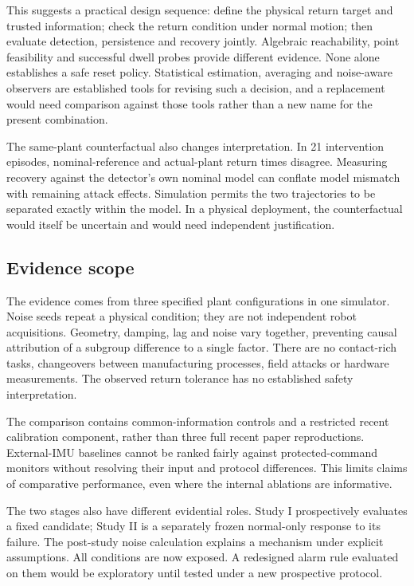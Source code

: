 \documentclass[11pt]{article}
\begin{document}
This suggests a practical design sequence: define the physical return target and trusted information; check the return condition under normal motion; then evaluate detection, persistence and recovery jointly. Algebraic reachability, point feasibility and successful dwell probes provide different evidence. None alone establishes a safe reset policy. Statistical estimation, averaging and noise-aware observers are established tools for revising such a decision, and a replacement would need comparison against those tools rather than a new name for the present combination.

The same-plant counterfactual also changes interpretation. In 21 intervention episodes, nominal-reference and actual-plant return times disagree. Measuring recovery against the detector's own nominal model can conflate model mismatch with remaining attack effects. Simulation permits the two trajectories to be separated exactly within the model. In a physical deployment, the counterfactual would itself be uncertain and would need independent justification.

\subsection{Evidence scope}
The evidence comes from three specified plant configurations in one simulator. Noise seeds repeat a physical condition; they are not independent robot acquisitions. Geometry, damping, lag and noise vary together, preventing causal attribution of a subgroup difference to a single factor. There are no contact-rich tasks, changeovers between manufacturing processes, field attacks or hardware measurements. The observed return tolerance has no established safety interpretation.

The comparison contains common-information controls and a restricted recent calibration component, rather than three full recent paper reproductions. External-IMU baselines cannot be ranked fairly against protected-command monitors without resolving their input and protocol differences. This limits claims of comparative performance, even where the internal ablations are informative.

The two stages also have different evidential roles. Study I prospectively evaluates a fixed candidate; Study II is a separately frozen normal-only response to its failure. The post-study noise calculation explains a mechanism under explicit assumptions. All conditions are now exposed. A redesigned alarm rule evaluated on them would be exploratory until tested under a new prospective protocol.
\end{document}
